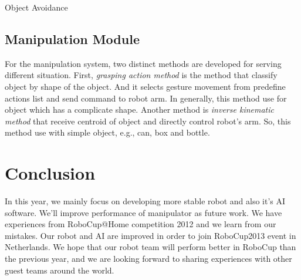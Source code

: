 \documentclass{llncs}
\begin{document}
Object Avoidance

\subsection{Manipulation Module}

For the manipulation system, two distinct methods are developed for serving different situation. First, \textit{grasping action method} is the method that classify object by shape of the object. And it selects gesture movement from predefine actions list and send command to robot arm. In generally, this method use for object which has a complicate shape. Another method is \textit{inverse kinematic method} that receive centroid of object and directly control robot's arm. So, this method use with simple object, e.g., can, box and bottle.

\section{Conclusion}

In this year, we mainly focus on developing more stable robot and also it's AI software. We'll improve performance of manipulator as future work. We have experiences from RoboCup@Home competition 2012 and we learn from our mistakes. Our robot and AI are improved in order to join RoboCup2013 event in Netherlands. We hope that our robot team will perform better in RoboCup than the previous year, and we are looking forward to sharing experiences with other guest teams around the world.
\end{document}
